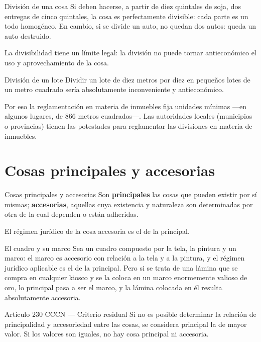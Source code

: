 \documentclass[12pt,oneside]{book}
\begin{document}
\begin{example}{División de una cosa}
Si deben hacerse, a partir de diez quintales de soja, dos entregas de cinco quintales, la cosa es perfectamente divisible: cada parte es un todo homogéneo. En cambio, si se divide un auto, no quedan dos autos: queda un auto destruido.
\end{example}

La divisibilidad tiene un límite legal: la división no puede tornar antieconómico el uso y aprovechamiento de la cosa.

\begin{example}{División de un lote}
Dividir un lote de diez metros por diez en pequeños lotes de un metro cuadrado sería absolutamente inconveniente y antieconómico.
\end{example}

Por eso la reglamentación en materia de inmuebles fija unidades mínimas ---en algunos lugares, de 866 metros cuadrados---. Las autoridades locales (municipios o provincias) tienen las potestades para reglamentar las divisiones en materia de inmuebles.

\section{Cosas principales y accesorias}

\begin{definition}{Cosas principales y accesorias}
Son \textbf{principales} las cosas que pueden existir por sí mismas; \textbf{accesorias}, aquellas cuya existencia y naturaleza son determinadas por otra de la cual dependen o están adheridas.
\end{definition}

El régimen jurídico de la cosa accesoria es el de la principal.

\begin{example}{El cuadro y su marco}
Sea un cuadro compuesto por la tela, la pintura y un marco: el marco es accesorio con relación a la tela y a la pintura, y el régimen jurídico aplicable es el de la principal. Pero si se trata de una lámina que se compra en cualquier kiosco y se la coloca en un marco enormemente valioso de oro, lo principal pasa a ser el marco, y la lámina colocada en él resulta absolutamente accesoria.
\end{example}

\begin{norma}{Artículo 230 CCCN --- Criterio residual}
Si no es posible determinar la relación de principalidad y accesoriedad entre las cosas, se considera principal la de mayor valor. Si los valores son iguales, no hay cosa principal ni accesoria.
\end{norma}
\end{document}
